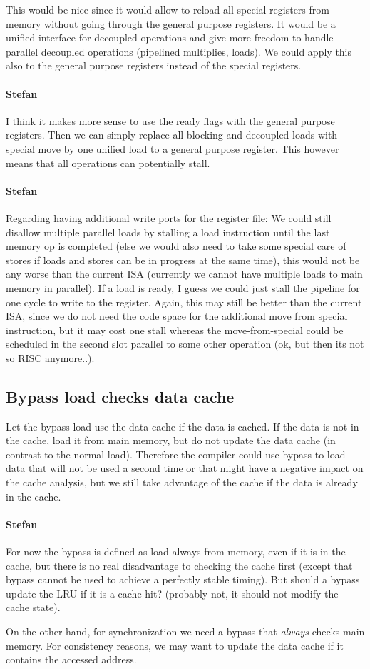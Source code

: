 \documentclass{IEEEtran}
\newcommand{\comment}[3]{\paragraph*{\textbf{#1}}{\color{#3}#2}}
\newcommand{\stefan}[1]{\comment{Stefan}{#1}{RoyalPurple}}
\begin{document}
This would be nice since it would allow to reload all special registers from
memory without going through the general purpose registers. It would be a
unified interface for decoupled operations and give more freedom to handle
parallel decoupled operations (pipelined multiplies, loads). We could apply this
also to the general purpose registers instead of the special registers.

\stefan{I think it makes more sense to use the ready flags with the general purpose registers. Then we can simply replace
all blocking and decoupled loads with special move by one unified load to a general purpose register. This however means
that all operations can potentially stall.}

\stefan{Regarding having additional write ports for the register file: We could still disallow multiple parallel loads by stalling a load
instruction until the last memory op is completed (else we would also need to take some special care of stores if loads and stores can be in progress at the same
time), this would not be any worse than the current ISA (currently we cannot have multiple loads to main memory in parallel). If a load is
ready, I guess we could just stall the pipeline for one cycle to write to the register. Again, this may still be better than the 
current ISA, since we do not need the code space for the additional move from special instruction, but it may cost one stall whereas the
move-from-special could be scheduled in the second slot parallel to some other operation (ok, but then its not so RISC anymore..).}

\subsection{Bypass load checks data cache}

Let the bypass load use the data cache if the data is cached. If the data is not in the cache, load it from main memory, but do not update
the data cache (in contrast to the normal load). Therefore the compiler could use bypass to load data that will not be used a second time or
that might have a negative impact on the cache analysis, but we still take advantage of the cache if the data is already in the cache.

\stefan{For now the bypass is defined as load always from memory, even if it is in the cache, but there is no real disadvantage to checking the
cache first (except that bypass cannot be used to achieve a perfectly stable timing). But should a bypass update the LRU if it is a cache
hit? (probably not, it should not modify the cache state).

On the other hand, for synchronization we need a bypass that \emph{always} checks main memory. For consistency reasons, we may want to
update the data cache if it contains the accessed address.}
\end{document}
